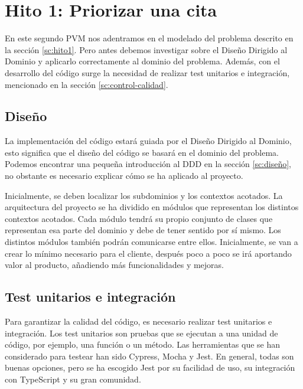\section{Hito 1: Priorizar una cita}

En este segundo PVM nos adentramos en el modelado del problema descrito en la sección \ref{sc:hito1}.
Pero antes debemos investigar sobre el Diseño Dirigido al Dominio y aplicarlo correctamente al dominio del problema. Además, con el desarrollo del
código surge la necesidad de realizar test unitarios e integración, mencionado en la sección \ref{sc:control-calidad}.

\subsection{Diseño}
La implementación del código estará guiada por el Diseño Dirigido al Dominio, esto significa que el diseño del código se basará en el dominio del problema.
Podemos encontrar una pequeña introducción al DDD en la sección \ref{sc:diseño}, no obstante es necesario explicar cómo se ha aplicado al proyecto.

Inicialmente, se deben localizar los subdominios y los contextos acotados. La arquitectura del proyecto se ha dividido en módulos que representan los distintos contextos acotados.
Cada módulo tendrá su propio conjunto de clases que representan esa parte del dominio y debe de tener sentido por sí mismo. Los distintos módulos también podrán comunicarse entre ellos.
Inicialmente, se van a crear lo mínimo necesario para el cliente, después poco a poco se irá aportando valor al producto, añadiendo más funcionalidades y mejoras.

\subsection{Test unitarios e integración}
Para garantizar la calidad del código, es necesario realizar test unitarios e integración. Los test unitarios son pruebas que se ejecutan a una unidad de código, por ejemplo, una función o un método.
Las herramientas que se han considerado para testear han sido Cypress, Mocha y Jest.
En general, todas son buenas opciones, pero se ha escogido Jest por su facilidad de uso, su integración con TypeScript y su gran comunidad.
